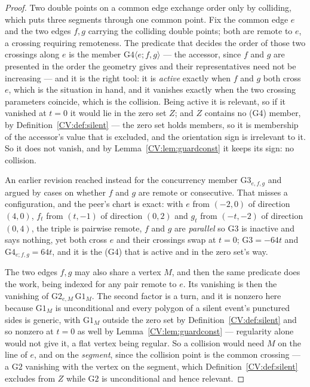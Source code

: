 \begin{proof}
Two double points on a common edge exchange order only by colliding, which puts
three segments through one common point. Fix the common edge $e$ and the two edges $f,g$ carrying the colliding double
points; both are remote to $e$, a crossing requiring remoteness. The predicate
that decides the order of those two crossings along $e$ is the member
$\mathrm{G4}\langle e;f,g\rangle$ --- the accessor, since $f$ and $g$ are
presented in the order the geometry gives and their representatives need not be
increasing --- and it is the right tool: it is \emph{active} exactly when $f$
and $g$ both cross $e$, which is the situation in hand, and it vanishes exactly
when the two crossing parameters coincide, which is the collision. Being active
it is relevant, so if it vanished at $t=0$ it would lie in the zero set $Z$;
and $Z$ contains no (G4) member, by Definition~\ref{CV:def:silent} --- the zero
set holds members, so it is membership of the accessor's value that is
excluded, and the orientation sign is irrelevant to it. So it does not
vanish, and by Lemma~\ref{CV:lem:guardconst} it keeps its sign: no collision.

An earlier revision reached instead for the concurrency member
$\mathrm{G3}_{e,f,g}$ and argued by cases on whether $f$ and $g$ are remote or
consecutive. That misses a configuration, and the peer's chart is exact: with
$e$ from $(-2,0)$ of direction $(4,0)$, $f_t$ from $(t,-1)$ of direction
$(0,2)$ and $g_t$ from $(-t,-2)$ of direction $(0,4)$, the triple is pairwise
remote, $f$ and $g$ are \emph{parallel} so $\mathrm{G3}$ is inactive and says
nothing, yet both cross $e$ and their crossings swap at $t=0$;
$\mathrm{G3}=-64t$ and $\mathrm{G4}_{e;f,g}=64t$, and it is the (G4) that is
active and in the zero set's way.

The two edges $f,g$ may also share a vertex $M$, and then the same predicate
does the work, being indexed for any pair remote to $e$. Its vanishing is then
the vanishing of $\mathrm{G2}_{e,M}\,\mathrm{G1}_M$. The second factor is a
turn, and it is nonzero here because $\mathrm{G1}_M$ is unconditional and every
polygon of a silent event's punctured sides is generic, with $\mathrm{G1}_M$
outside the zero set by Definition~\ref{CV:def:silent} and so nonzero at $t=0$ as
well by Lemma~\ref{CV:lem:guardconst} --- regularity alone would not give it, a
flat vertex being regular. So a collision would need $M$ on the line of $e$, and
on the \emph{segment}, since the collision point is the common crossing
--- a $\mathrm{G2}$ vanishing with the vertex on the segment, which
Definition~\ref{CV:def:silent} excludes from $Z$ while $\mathrm{G2}$ is
unconditional and hence relevant.


\end{proof}
